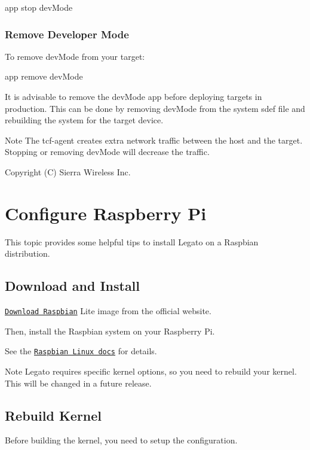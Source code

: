 \begin{DoxyVerb}app stop devMode \end{DoxyVerb}
\hypertarget{basicTargetDevMode_devMode_removeDev}{}\subsubsection{Remove Developer Mode}\label{basicTargetDevMode_devMode_removeDev}
To remove dev\+Mode from your target\+:

\begin{DoxyVerb}app remove devMode \end{DoxyVerb}


It is advisable to remove the dev\+Mode app before deploying targets in production. This can be done by removing dev\+Mode from the system sdef file and rebuilding the system for the target device.

\begin{DoxyNote}{Note}
The tcf-\/agent creates extra network traffic between the host and the target. Stopping or removing dev\+Mode will decrease the traffic.
\end{DoxyNote}
Copyright (C) Sierra Wireless Inc. \hypertarget{raspbianMain}{}\section{Configure Raspberry Pi}\label{raspbianMain}
This topic provides some helpful tips to install Legato on a Raspbian distribution.\hypertarget{raspbianMain_raspbianMain_downloadRaspbian_downloadInstall}{}\subsection{Download and Install}\label{raspbianMain_raspbianMain_downloadRaspbian_downloadInstall}
\href{https://www.raspberrypi.org/downloads/raspbian/}{\tt Download Raspbian} Lite image from the official website.

Then, install the Raspbian system on your Raspberry Pi.

See the \href{https://www.raspberrypi.org/documentation/installation/installing-images/linux.md}{\tt Raspbian Linux docs} for details.

\begin{DoxyNote}{Note}
Legato requires specific kernel options, so you need to rebuild your kernel. This will be changed in a future release.
\end{DoxyNote}
\hypertarget{raspbianMain_raspbianMain_rebuildKernel}{}\subsection{Rebuild Kernel}\label{raspbianMain_raspbianMain_rebuildKernel}
Before building the kernel, you need to setup the configuration.

